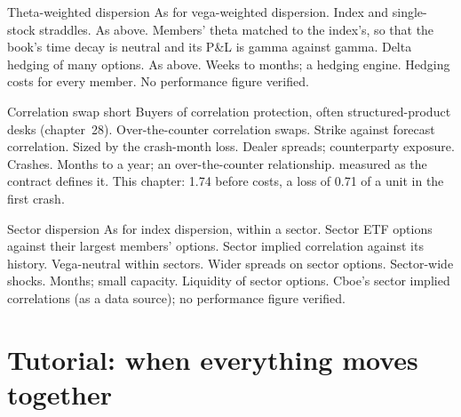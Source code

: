 \begin{strategyfile}{Theta-weighted dispersion}\label{strat:s2:dispersion-and-correlation:theta}
 As for vega-weighted dispersion.
 Index and single-stock straddles.
 As above.
 Members' theta matched to the index's, so that the book's time decay is neutral and its P\&L is gamma against gamma.
 Delta hedging of many options.
 As above.
 Weeks to months; a hedging engine.
 Hedging costs for every member.
 No performance figure verified.
\end{strategyfile}

\begin{strategyfile}{Correlation swap short}\label{strat:s2:dispersion-and-correlation:corrswap}
 Buyers of correlation protection, often structured-product desks (chapter~28).
 Over-the-counter correlation swaps.
 Strike against forecast correlation.
 Sized by the crash-month loss.
 Dealer spreads; counterparty exposure.
 Crashes.
 Months to a year; an over-the-counter relationship.
  measured as the contract defines it.
 This chapter: 1.74 before costs, a loss of 0.71 of a unit in the first crash.
\end{strategyfile}

\begin{strategyfile}{Sector dispersion}\label{strat:s2:dispersion-and-correlation:sector}
 As for index dispersion, within a sector.
 Sector ETF options against their largest members' options.
 Sector implied correlation against its history.
 Vega-neutral within sectors.
 Wider spreads on sector options.
 Sector-wide shocks.
 Months; small capacity.
 Liquidity of sector options.
 Cboe's sector implied correlations (as a data source); no performance figure verified.
\end{strategyfile}

\section{Tutorial: when everything moves together}\label{tut:s2:dispersion-and-correlation:tut}

